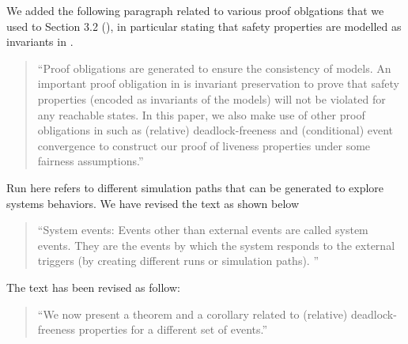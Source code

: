 \documentclass{response}
\begin{document}
\begin{comment}{Reviewer \#1}
• p.18 It would have been interesting to state the discussion of the first
paragraph of section 7: Verification of Safety Properties within the
context of the proof obligation generator you have at hand.
\end{comment}

\begin{response}
  We added the following paragraph related to various proof oblgations
  that we used to Section 3.2 (\EventB), in particular stating that
  safety properties are modelled as invariants in \EventB.
  \begin{quote}
    ``Proof obligations are generated to ensure the consistency of
  \mbox{\EventB} models.  An important proof obligation in
  \mbox{\EventB} is invariant preservation to prove that safety
  properties (encoded as invariants of the models) will not be violated
  for any reachable states. In this paper, we also make use of other
  proof obligations in \mbox{\EventB} such as (relative)
  deadlock-freeness and (conditional) event convergence to construct
  our proof of liveness properties under some fairness assumptions.''
  \end{quote}
\end{response}

\begin{comment}{Reviewer \#1}
• p.19 Could you precise your notion of run.
\end{comment}

\begin{response}
  Run here refers to different simulation paths that can be generated to explore systems behaviors.
  We have revised the text as shown below
  \begin{quote}
    ``System events: Events other than external events are called system events.
    They are the events by which the system responds to the external triggers (by creating 
    different runs or simulation paths). 
   ''
  \end{quote}
\end{response}


\begin{comment}{Reviewer \#1}
• p. 20 typo. We are now present
\end{comment}

\begin{response}
  The text has been revised as follow:
  \begin{quote}
    ``We now present a theorem and a corollary related to (relative)
    deadlock-freeness properties for a different set of events.''
  \end{quote}
\end{response}
\end{document}
